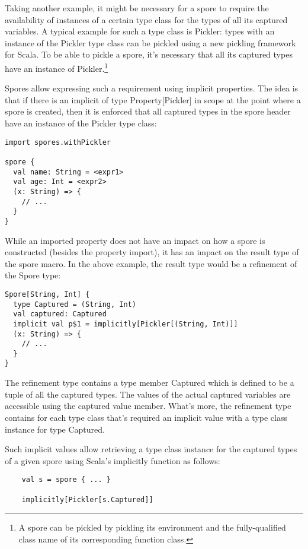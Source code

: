 Taking another example, it might be necessary for a spore to require the availability of instances of a certain type class for the types of all its captured variables. A typical example for such a type class is Pickler: types with an instance of the Pickler type class can be pickled using a new pickling framework for Scala. To be able to pickle a spore, it's necessary that all its captured types have an instance of Pickler.\footnote{A spore can be pickled by pickling its environment and the fully-qualified class name of its corresponding function class.}

Spores allow expressing such a requirement using implicit properties. The idea is that if there is an implicit of type Property[Pickler] in scope at the point where a spore is created, then it is enforced that all captured types in the spore header have an instance of the Pickler type class:

\begin{verbatim}
import spores.withPickler

spore {
  val name: String = <expr1>
  val age: Int = <expr2>
  (x: String) => {
    // ...
  }
}
\end{verbatim}

While an imported property does not have an impact on how a spore is constructed (besides the property import), it has an impact on the result type of the spore macro. In the above example, the result type would be a refinement of the Spore type:

\begin{verbatim}
Spore[String, Int] {
  type Captured = (String, Int)
  val captured: Captured
  implicit val p$1 = implicitly[Pickler[(String, Int)]]
  (x: String) => {
    // ...
  }
}
\end{verbatim}

The refinement type contains a type member Captured which is defined to be a tuple of all the captured types. The values of the actual captured variables are accessible using the captured value member. What's more, the refinement type contains for each type class that's required an implicit value with a type class instance for type Captured.

Such implicit values allow retrieving a type class instance for the captured types of a given spore using Scala's implicitly function as follows:

\begin{verbatim}
    val s = spore { ... }

    implicitly[Pickler[s.Captured]]
\end{verbatim}

